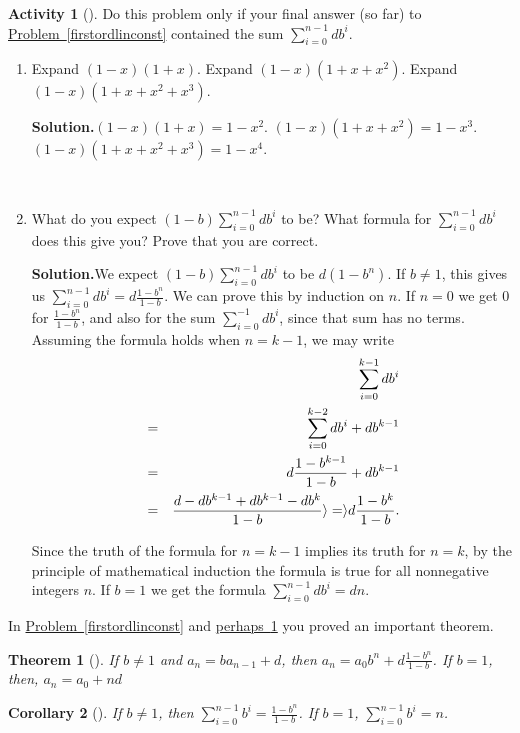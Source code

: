 \documentclass[10pt,]{book}
\theoremstyle{plain}
\newtheorem{theorem}{Theorem}[section]
\newtheorem{corollary}[theorem]{Corollary}
\theoremstyle{definition}
\newtheorem{activity}[project]{Activity}
\numberwithin{equation}{chapter}
\newcommand{\amp}{&}
\begin{document}
\begin{activity}[]\label{sumgeometricseries}
Do this problem only if your final answer (so far) to \hyperref[firstordlinconst]{Problem~\ref{firstordlinconst}} contained the sum \(\sum_{i=0}^{n-1}db^i\).%
~\par
\begin{enumerate}[label=(\alph*)]
 \item Expand \((1-x)(1+x)\).  Expand \((1-x)(1+x+x^2)\). Expand \((1-x)(1+x+x^2+x^3)\).%
\par\medskip\noindent%
\textbf{Solution.}\quad \((1-x)(1+x)=1-x^2\). \((1-x)(1+x+x^2)=1-x^3\). \((1-x)(1+x+x^2+x^3)=1-x^4\).%

~\par
\item What do you expect \((1-b)\sum_{i=0}^{n-1} db^i\) to be?  What formula for \(\sum_{i=0}^{n-1}db^i\) does this give you?  Prove that you are correct.%
\par\medskip\noindent%
\textbf{Solution.}\quad We expect \((1-b)\sum_{i=0}^{n-1} db^i\) to be \(d(1-b^n)\). If \(b\not=1\), this gives us \(\sum_{i=0}^{n-1}db^i=d\frac{1-b^n}{1-b}.\) We can prove this by induction on \(n\). If \(n=0\) we get 0 for \(\frac{1-b^n}{1-b}\), and also for the sum \(\sum_{i=0}^{-1}db^i\), since that sum has no terms. Assuming the formula holds when \(n=k-1\), we may write%
\begin{align*}
\amp \amp \sum_{i=0}^{k-1} db^i\\
\amp =\amp \sum_{i=0}^{k-2}db^i+db^{k-1}\\
\amp =\amp d{1-b^{k-1}\over 1-b}+db^{k-1}\\
\amp =\amp { d-db^{k-1}  +db^{k-1}-db^k\over 1-b}\rangle =\rangle  d\frac{1-b^k}{1-b}.
\end{align*}
%
\par
Since the truth of the formula for \(n=k-1\) implies its truth for \(n=k\), by the principle of mathematical induction the formula is true for all nonnegative integers \(n\). If \(b=1\) we get the formula \(\sum_{i=0}^{n-1}db^i=dn\).%

\end{enumerate}
\end{activity}
In \hyperref[firstordlinconst]{Problem~\ref{firstordlinconst}} and \hyperref[sumgeometricseries]{perhaps~\ref{sumgeometricseries}} you proved an important theorem.%
\begin{theorem}[{}]\label{theorem-2}
If \(b\not=1\) and \(a_n=ba_{n-1} +d\), then \(\displaystyle a_n =
a_0b^n + d\frac{1-b^n}{1-b}\). If \(b=1\), then, \(\displaystyle a_n =
a_0 +nd\)%
\end{theorem}
\begin{corollary}[{}]\label{corollary-1}
If \(b\not=1\), then \(\displaystyle \sum_{i=0}^{n-1}b^i =
\frac{1-b^n}{1-b}\). If \(b=1\), \(\displaystyle \sum_{i=0}^{n-1}b^i =n\).%
\end{corollary}
\typeout{************************************************}
\typeout{************************************************}
\end{document}
